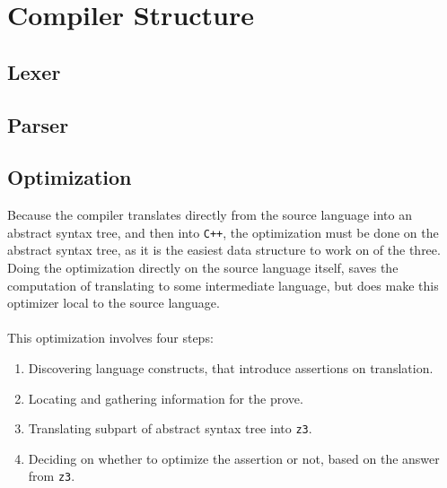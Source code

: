 \section{Compiler Structure}

\subsection{Lexer}

\subsection{Parser}

\subsection{Optimization}
Because the compiler translates directly from the source language into an abstract syntax tree,
and then into \texttt{C++}, the optimization must be done on the abstract syntax tree, as it is
the easiest data structure to work on of the three. Doing the optimization directly on the source
language itself, saves the computation of translating to some intermediate language, but does
make this optimizer local to the source language.
\\
\\
This optimization involves four steps:
\begin{enumerate}
    \item Discovering language constructs, that introduce assertions on translation.
    \item Locating and gathering information for the prove.
    \item Translating subpart of abstract syntax tree into \texttt{z3}.
    \item Deciding on whether to optimize the assertion or not, based on the answer
          from \texttt{z3}.
\end{enumerate}

